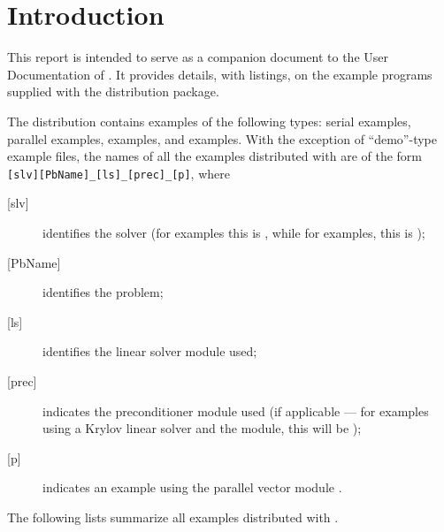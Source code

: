 \section{Introduction}\label{s:ex_intro}

This report is intended to serve as a companion document to the User
Documentation of {\ida} \cite{ida_ug}.  It provides details, with
listings, on the example programs supplied with the {\ida} distribution
package.

The {\ida} distribution contains examples of the following types: serial
{\CC} examples, parallel {\CC} examples, {\petsc} examples, and {\trilinos}
examples.
With the exception of ``demo''-type example files, the names of all the examples 
distributed with {\sundials} are of the form \verb![slv][PbName]_[ls]_[prec]_[p]!, 
where
\begin{description}
\item [{[slv]}] identifies the solver (for {\ida} examples this is , 
  while for {\fida} examples, this is );
\item [{[PbName]}] identifies the problem;
\item [{[ls]}] identifies the linear solver module used;
\item [{[prec]}] indicates the {\ida} preconditioner module used
  (if applicable --- for examples using a Krylov linear solver
  and the {\idabbdpre} module, this will be );
\item [{[p]}] indicates an example using the parallel vector module {\nvecp}.
\end{description}

\vspace{0.2in}\noindent
The following lists summarize all examples distributed with {\ida}.

